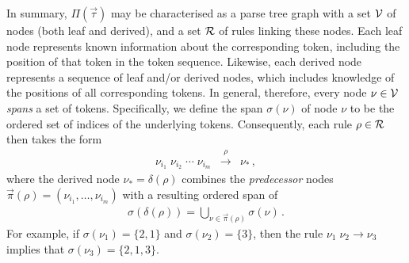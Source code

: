 \documentclass[a4paper]{article}
\begin{document}
In summary, $\Pi(\vec{\tau})$ may be characterised as a parse tree graph with a 
set ${\cal V}$ of nodes (both leaf and derived), and 
a set ${\cal R}$ of rules linking these nodes.
Each leaf node represents known information about the corresponding 
token, including the position of that token in the token sequence.
Likewise, each derived node represents a 
sequence of leaf and/or derived nodes, which includes knowledge of the positions of all corresponding tokens.
In general, therefore, every node $\nu\in{\cal V}$ {\em spans} a set of tokens. Specifically, we define
the span $\sigma(\nu)$ of node $\nu$ to be the ordered set of
indices of the underlying tokens. 
Consequently, each rule $\rho\in{\cal R}$ then takes the form
\begin{eqnarray}
\nu_{i_1}\;\nu_{i_2}\;\cdots\;\nu_{i_m} & \stackrel{\rho}{\rightarrow} & \nu_*\,,
\end{eqnarray}
where the derived node $\nu_*=\delta(\rho)$ combines the {\em predecessor} nodes 
$\vec{\pi}(\rho)=(\nu_{i_1},\ldots,\nu_{i_m})$
with a resulting ordered span of
\begin{eqnarray}
\sigma(\delta(\rho))=\bigcup_{\nu\in\vec{\pi}(\rho)}\sigma(\nu)\,.
\end{eqnarray}
 For example, if $\sigma(\nu_1)=\{2,1\}$ and $\sigma(\nu_2)=\{3\}$, then the rule
$\nu_1\;\nu_2\rightarrow\nu_3$ implies that $\sigma(\nu_3)=\{2,1,3\}$.
\end{document}
